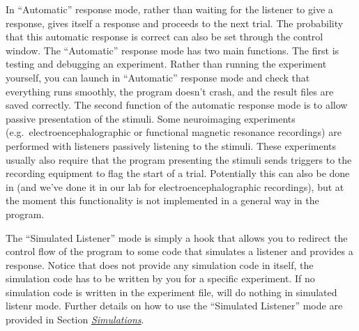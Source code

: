 \documentclass[a4paper,12pt,english]{sphinxmanual}
\begin{document}
In “Automatic” response mode, rather than waiting for the listener to
give a response,  gives itself a response and proceeds
to the next trial. The probability that this automatic response is
correct can also be set through the control window. The “Automatic”
response mode has two main functions. The first is testing and debugging
an experiment. Rather than running the experiment yourself, you can
launch  in “Automatic” response mode and check that
everything runs smoothly, the program doesn’t crash, and the result
files are saved correctly. The second function of the automatic response
mode is to allow passive presentation of the stimuli. Some neuroimaging
experiments (e.g. electroencephalographic or functional magnetic
resonance recordings) are performed with listeners passively listening
to the stimuli. These experiments usually also require that the program
presenting the stimuli sends triggers to the recording equipment to flag
the start of a trial. Potentially this can also be done in
 (and we’ve done it in our lab for
electroencephalographic recordings), but at the moment this
functionality is not implemented in a general way in the program.

The “Simulated Listener” mode is simply a hook that allows you to
redirect the control flow of the program to some code that simulates a
listener and provides a response. Notice that  does
not provide any simulation code in itself, the simulation code has to be
written by you for a specific experiment. If no simulation code is
written in the experiment file,  will do nothing in
simulated listenr mode. Further details on how to use the “Simulated
Listener” mode are provided in Section {\hyperref[custom_experiments:sec-simulations]{\emph{Simulations}}}.
\end{document}
